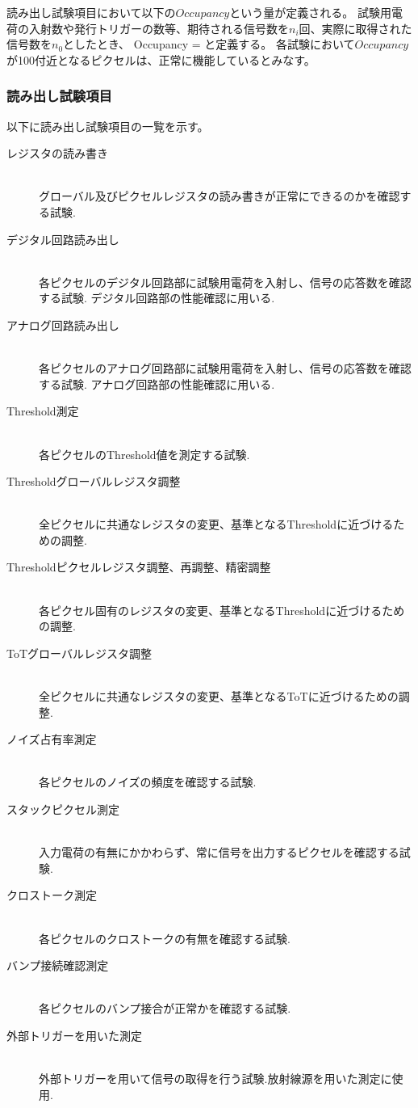 読み出し試験項目において以下の$Occupancy$という量が定義される。
試験用電荷の入射数や発行トリガーの数等、期待される信号数を$n_i$回、実際に取得された信号数を$n_0$としたとき、
\bbb
\label{occupancy}
Occupancy =  
\eee
と定義する。
各試験において$Occupancy$が100付近となるピクセルは、正常に機能しているとみなす。

\subsubsection{読み出し試験項目}
以下に読み出し試験項目の一覧を示す。
\begin{description}
  \item[レジスタの読み書き]\mbox{}\\
グローバル及びピクセルレジスタの読み書きが正常にできるのかを確認する試験.
  \item[デジタル回路読み出し]\mbox{} \\
各ピクセルのデジタル回路部に試験用電荷を入射し、信号の応答数を確認する試験. デジタル回路部の性能確認に用いる.
  \item[アナログ回路読み出し]\mbox{}\\
各ピクセルのアナログ回路部に試験用電荷を入射し、信号の応答数を確認する試験. アナログ回路部の性能確認に用いる.
  \item[Threshold測定]\mbox{}\\
各ピクセルのThreshold値を測定する試験.
  \item[Thresholdグローバルレジスタ調整]\mbox{}\\
全ピクセルに共通なレジスタの変更、基準となるThresholdに近づけるための調整.
  \item[Thresholdピクセルレジスタ調整、再調整、精密調整]\mbox{}\\
各ピクセル固有のレジスタの変更、基準となるThresholdに近づけるための調整.
  \item[ToTグローバルレジスタ調整]\mbox{}\\
全ピクセルに共通なレジスタの変更、基準となるToTに近づけるための調整.
  \item[ノイズ占有率測定]\mbox{}\\
各ピクセルのノイズの頻度を確認する試験.
  \item[スタックピクセル測定]\mbox{}\\
入力電荷の有無にかかわらず、常に信号を出力するピクセルを確認する試験.
  \item[クロストーク測定]\mbox{}\\
各ピクセルのクロストークの有無を確認する試験.
  \item[バンプ接続確認測定]\mbox{}\\
各ピクセルのバンプ接合が正常かを確認する試験.
  \item[外部トリガーを用いた測定]\mbox{}\\
外部トリガーを用いて信号の取得を行う試験.放射線源を用いた測定に使用.
\end{description}

